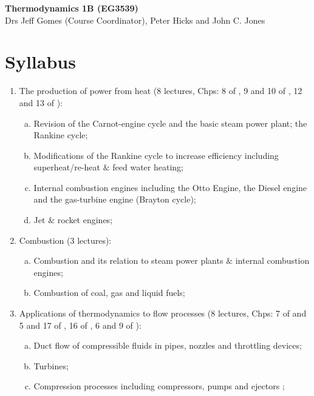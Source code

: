 \documentclass[11pt,oneside,a4paper]{article}
\begin{document}
\setcounter{page}{1}

\begin{center}
{\bf {\Large Thermodynamics 1B (EG3539)}}\\
{\large Drs Jeff Gomes (Course Coordinator), Peter Hicks and John C. Jones}
\end{center}


\section{ Syllabus }

\begin{enumerate}[{\bf Module 1:}]
%
\item The production of power from heat (8 lectures, Chps: 8 of \cite{smith_2001}, 9 and 10 of \cite{cengel_2010}, 12 and 13 of \cite{rajput_2007}): 
\begin{enumerate}[(a)]
\item Revision of the Carnot-engine cycle and the basic steam power plant; the Rankine cycle; 
\item Modifications of the Rankine cycle to increase efficiency including superheat/re-heat $\&$ feed water heating; 
\item Internal combustion engines including the Otto Engine, the Diesel engine and the gas-turbine engine (Brayton cycle); 
\item Jet $\&$ rocket engines;
\end{enumerate}
%
\item Combustion (3 lectures):%
\begin{enumerate}[(a)]
\item Combustion and its relation to steam power plants $\&$ internal combustion engines; 
\item Combustion of coal, gas and liquid fuels;
\end{enumerate}
%
\item Applications of thermodynamics to flow processes (8 lectures, Chps: 7 of \cite{smith_2001} and 5 and 17 of \cite{cengel_2010}, 16 of \cite{rajput_2007}, 6 and 9 of \cite{powers_2012}): 
\begin{enumerate}[(a)]
\item Duct flow of compressible fluids in pipes, nozzles and throttling devices; 
\item Turbines; 
\item Compression processes including compressors, pumps and ejectors ;

\end{enumerate}
\end{enumerate}
\end{document}
